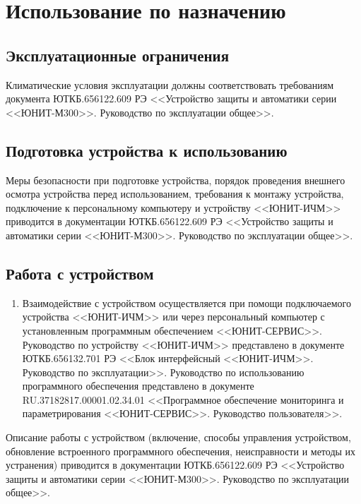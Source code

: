 \color{unimain}\section[Использование по назначению]{Использование по назначению}\label{sec:using}
\color{black}

\color{unimain}\subsection{Эксплуатационные ограничения}\color{black}
Климатические условия эксплуатации должны соответствовать требованиям документа ЮТКБ.656122.609 РЭ <<Устройство защиты и автоматики серии <<ЮНИТ-М300>>. Руководство по эксплуатации общее>>.

\color{unimain}\subsection{Подготовка устройства к использованию}\color{black}
Меры безопасности при подготовке устройства, порядок проведения внешнего осмотра устройства перед использованием, требования к монтажу устройства, подключение к персональному компьютеру и устройству <<ЮНИТ-ИЧМ>> приводится в документации ЮТКБ.656122.609 РЭ <<Устройство защиты и автоматики серии <<ЮНИТ-М300>>. Руководство по эксплуатации общее>>.

\color{unimain}\subsection{Работа с устройством}\color{black}

\begin{enumerate}
\item
Взаимодействие с устройством осуществляется при помощи подключаемого устройства <<ЮНИТ-ИЧМ>> или через персональный компьютер с установленным программным обеспечением <<ЮНИТ-СЕРВИС>>. Руководство по устройству <<ЮНИТ-ИЧМ>> представлено в документе ЮТКБ.656132.701 РЭ <<Блок интерфейсный <<ЮНИТ-ИЧМ>>. Руководство по эксплуатации>>. Руководство по использованию программного обеспечения представлено в документе RU.37182817.00001.02.34.01 <<Программное обеспечение мониторинга и параметрирования <<ЮНИТ-СЕРВИС>>. Руководство пользователя>>.


\end{enumerate}

\par
Описание работы с устройством (включение, способы управления устройством, обновление встроенного программного обеспечения, неисправности и методы их устранения) приводится в документации ЮТКБ.656122.609 РЭ <<Устройство защиты и автоматики серии <<ЮНИТ-М300>>. Руководство по эксплуатации общее>>.